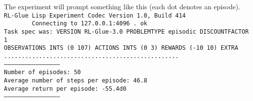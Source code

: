 \documentclass[11pt,a4paper,dvipdfm]{article}
\newcommand{\selfref}[1]{\href{#1}{#1}}
\newcommand{\prompttext}[1]{\texttt{#1}}
\begin{document}
\newpage

The experiment will prompt something like this (each dot denotes an episode). \\
\prompttext{RL-Glue Lisp Experiment Codec Version 1.0, Build 414 \\
\mbox{~~~~~~~~}Connecting to 127.0.0.1:4096 .~ok \\
Task spec was:~VERSION RL-Glue-3.0 PROBLEMTYPE episodic DISCOUNTFACTOR 1 \\
OBSERVATIONS INTS (0 107) ACTIONS INTS (0 3) REWARDS (-10 10) EXTRA \\
.................................................. \\
----------------------------------------------- \\
Number of episodes:~50 \\
Average number of steps per episode:~46.8 \\
Average return per episode:~-55.4d0 \\
-----------------------------------------------}


%
%

%
\end{document}
